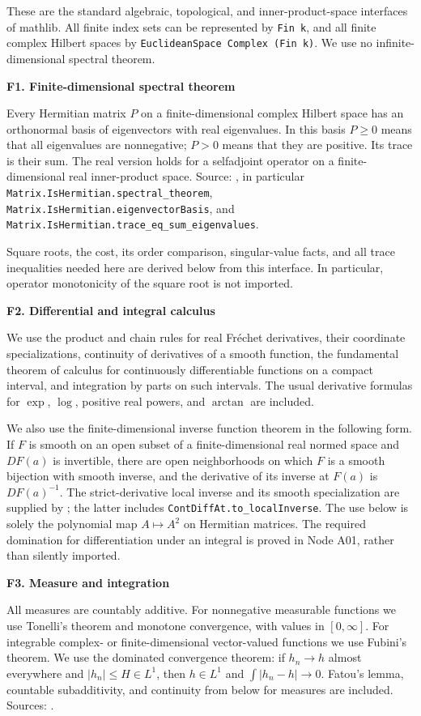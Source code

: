 \documentclass[11pt]{article}
\theoremstyle{remark}\newtheorem{remark}[theorem]{Remark}
\newcommand{\lib}[2]{\par\medskip\noindent\textbf{#1. #2}\par}
\begin{document}
These are the standard algebraic, topological, and inner-product-space interfaces of mathlib. All finite index sets can be represented by \texttt{Fin k}, and all finite complex Hilbert spaces by \texttt{EuclideanSpace Complex (Fin k)}. We use no infinite-dimensional spectral theorem.

\lib{F1}{Finite-dimensional spectral theorem}
Every Hermitian matrix $P$ on a finite-dimensional complex Hilbert space has an orthonormal basis of eigenvectors with real eigenvalues. In this basis $P\ge0$ means that all eigenvalues are nonnegative; $P>0$ means that they are positive. Its trace is their sum. The real version holds for a selfadjoint operator on a finite-dimensional real inner-product space. Source: \cite{ml-spectrum}, in particular \texttt{Matrix.\allowbreak IsHermitian.\allowbreak spectral\_\allowbreak theorem}, \texttt{Matrix.\allowbreak IsHermitian.\allowbreak eigenvectorBasis}, and \texttt{Matrix.\allowbreak IsHermitian.\allowbreak trace\_\allowbreak eq\_\allowbreak sum\_\allowbreak eigenvalues}.

Square roots, the cost, its order comparison, singular-value facts, and all trace inequalities needed here are derived below from this interface. In particular, operator monotonicity of the square root is not imported.

\lib{F2}{Differential and integral calculus}
We use the product and chain rules for real Fr\'echet derivatives, their coordinate specializations, continuity of derivatives of a smooth function, the fundamental theorem of calculus for continuously differentiable functions on a compact interval, and integration by parts on such intervals. The usual derivative formulas for $\exp$, $\log$, positive real powers, and $\arctan$ are included.

We also use the finite-dimensional inverse function theorem in the following form. If $F$ is smooth on an open subset of a finite-dimensional real normed space and $DF(a)$ is invertible, there are open neighborhoods on which $F$ is a smooth bijection with smooth inverse, and the derivative of its inverse at $F(a)$ is $DF(a)^{-1}$. The strict-derivative local inverse and its smooth specialization are supplied by \cite{ml-ift}; the latter includes \texttt{ContDiffAt.\allowbreak to\_\allowbreak localInverse}. The use below is solely the polynomial map $A\mapsto A^2$ on Hermitian matrices. The required domination for differentiation under an integral is proved in Node A01, rather than silently imported.

\lib{F3}{Measure and integration}
All measures are countably additive. For nonnegative measurable functions we use Tonelli's theorem and monotone convergence, with values in $[0,\infty]$. For integrable complex- or finite-dimensional vector-valued functions we use Fubini's theorem. We use the dominated convergence theorem: if $h_n\to h$ almost everywhere and $|h_n|\le H\in L^1$, then $h\in L^1$ and $\int|h_n-h|\to0$. Fatou's lemma, countable subadditivity, and continuity from below for measures are included. Sources: \cite{ml-prod,ml-dct}.
\end{document}
